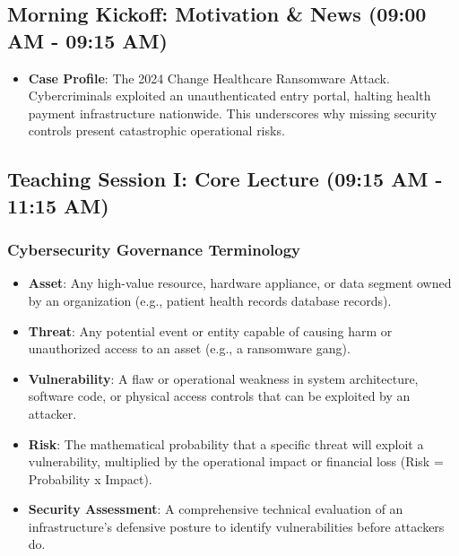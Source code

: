 \documentclass[12pt,openany]{book}
\begin{document}
\medskip

\subsection*{Morning Kickoff: Motivation \& News (09:00 AM - 09:15 AM)}


\begin{itemize}

  \item \textbf{Case Profile}: The 2024 Change Healthcare Ransomware Attack. Cybercriminals exploited an unauthenticated entry portal, halting health payment infrastructure nationwide. This underscores why missing security controls present catastrophic operational risks.

\end{itemize}

\medskip

\subsection*{Teaching Session I: Core Lecture (09:15 AM - 11:15 AM)}


\subsubsection*{Cybersecurity Governance Terminology}


\begin{itemize}

  \item \textbf{Asset}: Any high-value resource, hardware appliance, or data segment owned by an organization (e.g., patient health records database records).

  \item \textbf{Threat}: Any potential event or entity capable of causing harm or unauthorized access to an asset (e.g., a ransomware gang).

  \item \textbf{Vulnerability}: A flaw or operational weakness in system architecture, software code, or physical access controls that can be exploited by an attacker.

  \item \textbf{Risk}: The mathematical probability that a specific threat will exploit a vulnerability, multiplied by the operational impact or financial loss (Risk = Probability x Impact).

  \item \textbf{Security Assessment}: A comprehensive technical evaluation of an infrastructure's defensive posture to identify vulnerabilities before attackers do.

\end{itemize}
\end{document}
